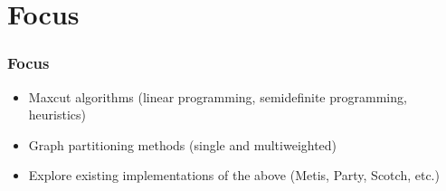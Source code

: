 \documentclass[xcolor={x11names, rgb, usenames, dvipsnames}]{beamer}
\begin{document}
\section{Focus}
\begin{frame}
  \frametitle{Focus}
  \begin{itemize}
    \item Maxcut algorithms (linear programming, semidefinite programming, heuristics)
    \item Graph partitioning methods (single and multiweighted)
    \item Explore existing implementations of the above (Metis, Party, Scotch, etc.)
  \end{itemize}
\end{frame}







% 	





% 
% 
\end{document}
